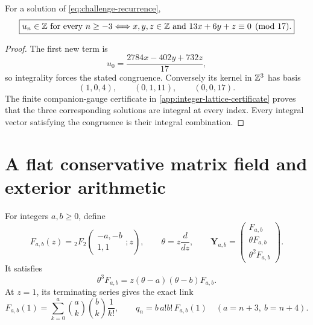 \begin{theorem}
\label{thm:ram-integer-lattice}
For a solution of \eqref{eq:challenge-recurrence},
\begin{equation}\label{eq:integer-lattice}
 \boxed{\displaystyle
 u_n\in\mathbb Z\ \text{for every }n\ge-3
 \Longleftrightarrow
 x,y,z\in\mathbb Z\ \text{and }13x+6y+z\equiv0\pmod{17}.}
\end{equation}
\end{theorem}

\begin{proof}
The first new term is
\begin{equation}\label{eq:u0-congruence}
 u_0=\frac{2784x-402y+732z}{17},
\end{equation}
so integrality forces the stated congruence.  Conversely its kernel in
\(\mathbb Z^3\) has basis
\[
 (1,0,4),\qquad(0,1,11),\qquad(0,0,17).
\]
The finite companion-gauge certificate in
\cref{app:integer-lattice-certificate} proves that the three corresponding
solutions are integral at every index.  Every integral vector satisfying the
congruence is their integral combination.
\end{proof}

\section{A flat conservative matrix field and exterior arithmetic}
\label{sec:cmf}

For integers \(a,b\ge0\), define
\begin{equation}\label{eq:Fab}
 F_{a,b}(z)={}_{2}F_{2}
 \!\left(\begin{matrix}-a,-b\\1,1\end{matrix};z\right),
 \qquad
 \theta=z\frac d{dz},
 \qquad
 \mathbf Y_{a,b}=
 \begin{pmatrix}F_{a,b}\\ \theta F_{a,b}\\ \theta^2F_{a,b}\end{pmatrix}.
\end{equation}
It satisfies
\begin{equation}\label{eq:Fab-ode}
 \theta^3F_{a,b}=z(\theta-a)(\theta-b)F_{a,b}.
\end{equation}
At \(z=1\), its terminating series gives the exact link
\begin{equation}\label{eq:q-Fab-link}
 F_{a,b}(1)=\sum_{k=0}^{a}\binom ak\binom bk\frac1{k!},
 \qquad q_n=b\,a!b!\,F_{a,b}(1)\quad(a=n+3,\ b=n+4).
\end{equation}

